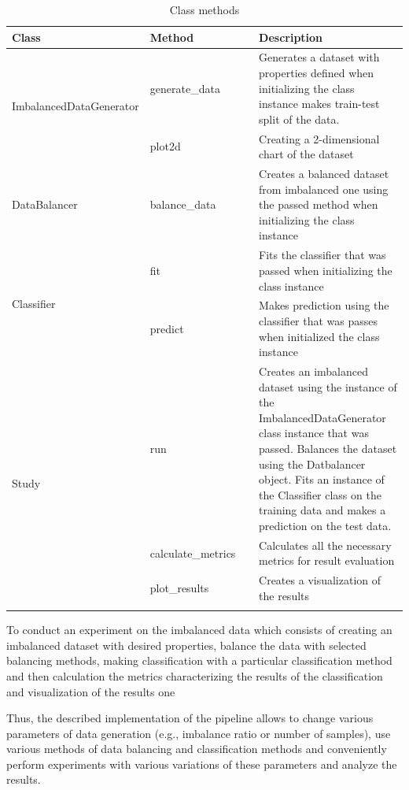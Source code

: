 \begin{longtable}{|p{0.30\linewidth}|p{0.30\linewidth}|p{0.40\linewidth}|}
\hline
\begin{minipage}[b]{\linewidth}\raggedright
Class
\end{minipage} & \begin{minipage}[b]{\linewidth}\raggedright
Method
\end{minipage} & \begin{minipage}[b]{\linewidth}\raggedright
Description
\end{minipage} \\
\hline
\midrule
\endhead
\multirow{2}{*}{ImbalancedDataGenerator} & generate\_data & Generates a dataset with properties defined when initializing the class instance makes train-test split of the data. \\
\cline{2-3}
& plot2d & Creating a 2-dimensional chart of the dataset \\
\hline
DataBalancer & balance\_data & Creates a balanced dataset from imbalanced one using the passed method when initializing the class instance \\
\hline
\multirow{2}{*}{Classifier} & fit & Fits the classifier that was passed when initializing the class instance \\
\cline{2-3}
& predict & Makes prediction using the classifier that was passes when initialized the class instance \\
\hline
\multirow{3}{*}{Study} & run & Creates an imbalanced dataset using the instance of the ImbalancedDataGenerator class instance that was passed. Balances the dataset using the Datbalancer object. Fits an instance of the Classifier class on the training data and makes a prediction on the test data. \\
\cline{2-3}
& calculate\_metrics & Calculates all the necessary metrics for result evaluation \\
\cline{2-3}
& plot\_results & Creates a visualization of the results \\
\bottomrule
\caption{Class methods}
\end{longtable}


To conduct an experiment on the imbalanced data which consists of
creating an imbalanced dataset with desired properties, balance the data
with selected balancing methods, making classification with a particular
classification method and then calculation the metrics characterizing
the results of the classification and visualization of the results one

Thus, the described implementation of the pipeline allows to change
various parameters of data generation (e.g., imbalance ratio or number
of samples), use various methods of data balancing and classification
methods and conveniently perform experiments with various variations of
these parameters and analyze the results.


